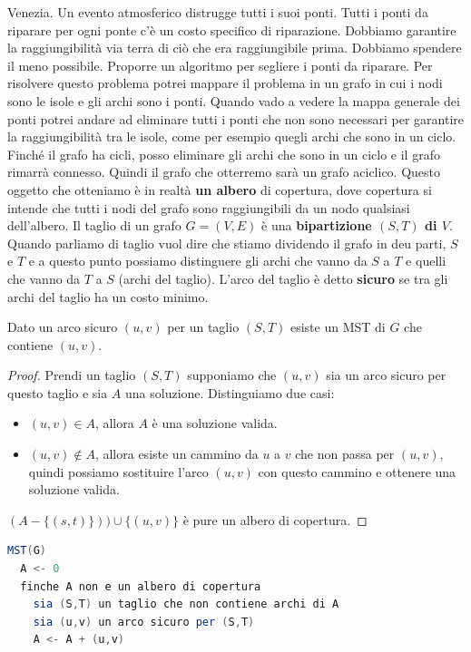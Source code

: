 \documentclass[a4paper]{article}
\begin{document}
Venezia. Un evento atmosferico distrugge tutti i suoi ponti. Tutti i ponti da riparare per ogni ponte c'è un costo specifico di riparazione.
Dobbiamo garantire la raggiungibilità via terra di ciò che era raggiungibile prima. Dobbiamo spendere il meno possibile.
Proporre un algoritmo per segliere i ponti da riparare. 
Per risolvere questo problema potrei mappare il problema in un grafo in cui i nodi sono le isole e gli archi sono i ponti.
Quando vado a vedere la mappa generale dei ponti potrei andare ad eliminare tutti i ponti che non sono necessari per garantire la raggiungibilità tra le isole, come per esempio quegli archi che sono in un ciclo.
Finché il grafo ha cicli, posso eliminare gli archi che sono in un ciclo e il grafo rimarrà connesso. Quindi il grafo che otterremo sarà un grafo aciclico.
Questo oggetto che otteniamo è in realtà \textbf{un albero} di copertura, dove copertura si intende che tutti i nodi del grafo sono raggiungibili da un nodo qualsiasi dell'albero.
{
  Il taglio di un grafo $G = (V,E)$ è una \textbf{bipartizione $(S,T)$ di $V$}. Quando parliamo di taglio vuol dire che stiamo 
  dividendo il grafo in deu parti, $S$ e $T$ e a questo punto possiamo distinguere gli archi 
  che vanno da $S$ a $T$ e quelli che vanno da $T$ a $S$ (archi del taglio).
}
\noindent
L'arco del taglio è detto \textbf{sicuro} se tra gli archi del taglio ha un costo minimo.

\begin{lemma}
  Dato un arco sicuro $(u,v)$ per un taglio $(S,T)$  esiste un MST di $G$ che contiene $(u,v)$.
\end{lemma}
\begin{proof}
  Prendi un taglio $(S,T)$ supponiamo che $(u,v)$ sia un arco sicuro per questo taglio e sia $A$ una soluzione.
  Distinguiamo due casi:
  \begin{itemize}
    \item $(u,v) \in A$, allora $A$ è una soluzione valida.
    \item $(u,v) \notin A$, allora esiste un cammino da $u$ a $v$ che non passa per $(u,v)$, quindi possiamo sostituire l'arco $(u,v)$ con questo cammino e ottenere una soluzione valida.
  \end{itemize}
  $(A - \{(s,t)\})) \cup \{(u,v)\}$ è pure un albero di copertura.
\end{proof}
\begin{lstlisting}[language=Scala]
MST(G)
  A <- 0
  finche A non e un albero di copertura 
    sia (S,T) un taglio che non contiene archi di A
    sia (u,v) un arco sicuro per (S,T)
    A <- A + (u,v)
\end{lstlisting}
\end{document}
